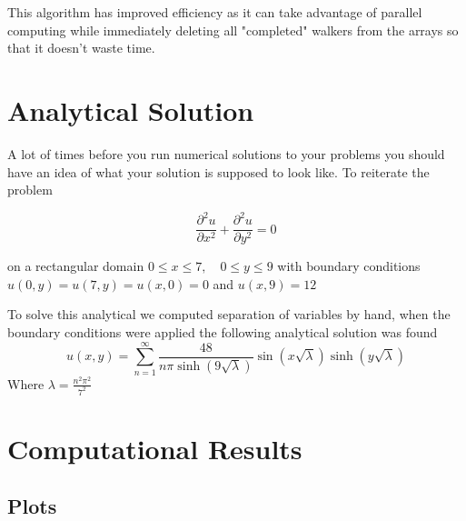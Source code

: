 \documentclass{amsart}
\begin{document}
This algorithm has improved efficiency as it can take advantage of parallel computing while immediately deleting all "completed" walkers from the arrays so that it doesn't waste time.
\section{Analytical Solution}

A lot of times before you run numerical solutions to your problems you should have an idea of what your solution is supposed to look like. To reiterate the problem

	$$\frac{\partial^2 u}{\partial x^2} + \frac{\partial^2 u}{\partial y^2} = 0$$

on a rectangular domain $0 \leq x \leq 7, \quad 0 \leq y \leq 9$ with boundary conditions $u(0,y) = u(7,y) = u(x,0) = 0$ and $u(x,9) = 12$ 

To solve this analytical we computed separation of variables by hand, when the boundary conditions were applied the following analytical solution was found
\begin{equation}
    u(x,y)= \sum _{n=1}^{\infty} \frac{48}{n \pi \sinh(9 \sqrt{\lambda})} \sin(x \sqrt{\lambda}) \sinh(y \sqrt{\lambda})
\end{equation}
Where $\lambda=\frac{n^2 \pi ^2}{7^2}$
\section{Computational Results}

\subsection{Plots}
\end{document}
